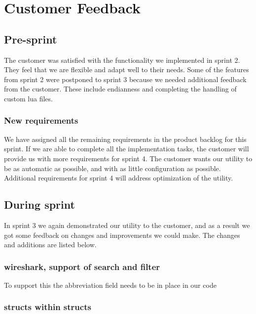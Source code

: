 \section{Customer Feedback}

\subsection{Pre-sprint}

The customer was satisfied with the functionality we implemented in sprint 2.
They feel that we are flexible and adapt well to their needs.
Some of the features from sprint 2 were postponed to sprint 3 because we needed additional feedback from the customer.
These include \gls{endianness} and completing the handling of custom \Gls{lua} files.

\subsubsection{New requirements}

We have assigned all the remaining requirements in the product backlog for this sprint.
If we are able to complete all the implementation tasks, the customer will provide us with more requirements for sprint 4.
The customer wants our \gls{utility} to be as automatic as possible, and with as little configuration as possible. 
Additional requirements for sprint 4 will address optimization of the \gls{utility}.

\subsection{During sprint}

In sprint 3 we again demonstrated our \gls{utility} to the customer, and as a result we got some feedback on changes
and improvements we could make. The changes and additions are listed below.

\subsubsection{\Gls{wireshark}, support of search and filter}

To support this the abbreviation field needs to be in place in our code

\subsubsection{\Glspl{struct} within \glspl{struct}}

